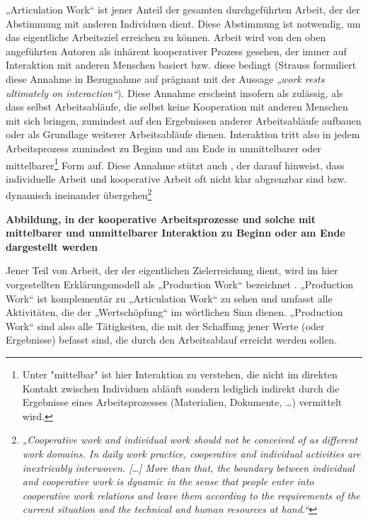 „Articulation Work“ ist jener Anteil der gesamten durchgeführten Arbeit, der der Abstimmung mit anderen Individuen dient. Diese Abstimmung ist notwendig, um das eigentliche Arbeitsziel erreichen zu können. Arbeit wird von den oben angeführten Autoren als inhärent kooperativer Prozess gesehen, der immer auf Interaktion mit anderen Menschen basiert bzw. diese bedingt (Strauss formuliert diese Annahme in Bezugnahme auf \citet{Hughes71} prägnant mit der Aussage \emph{„work rests ultimately on interaction“}). Diese Annahme erscheint insofern als zulässig, als dass selbst Arbeitsabläufe, die selbst keine Kooperation mit anderen Menschen mit sich bringen, zumindest auf den Ergebnissen anderer Arbeitsabläufe aufbauen oder als Grundlage weiterer Arbeitsabläufe dienen. Interaktion tritt also in jedem Arbeitsprozess zumindest zu Beginn und am Ende in unmittelbarer oder mittelbarer\footnote{Unter "mittelbar" ist hier Interaktion zu verstehen, die nicht im direkten Kontakt zwischen Individuen abläuft sondern lediglich indirekt durch die Ergebnisse eines Arbeitsprozesses (Materialien, Dokumente, \ldots) vermittelt wird.} Form auf. Diese Annahme stützt auch \citet{Schmidt94}, der darauf hinweist, dass individuelle Arbeit und kooperative Arbeit oft nicht klar abgrenzbar sind bzw. dynamisch ineinander übergehen\footnote{\emph{„Cooperative work and individual work should not be conceived of as different work domains. In daily work practice, cooperative and individual activities are inextricably interwoven. [\ldots] More than that, the boundary between individual and cooperative work is dynamic in the sense that people enter into cooperative work relations and leave them according to the requirements of the 
current situation and the technical and human resources at hand.“}\citep[][S. 352]{Schmidt94}}

\textbf{Abbildung, in der kooperative Arbeitsprozesse und solche mit mittelbarer und unmittelbarer Interaktion zu Beginn oder am Ende dargestellt werden}

Jener Teil von Arbeit, der der eigentlichen Zielerreichung dient, wird im hier vorgestellten Erklärungsmodell als „Production Work“ bezeichnet \citep{Fujimura87}. „Production Work“ ist komplementär zu „Articulation Work“ zu sehen und umfasst alle Aktivitäten, die der „Wertschöpfung“ im wörtlichen Sinn dienen. „Production Work“ sind also alle Tätigkeiten, die mit der Schaffung jener Werte (oder Ergebnisse) befasst sind, die durch den Arbeitsablauf erreicht werden sollen.  

